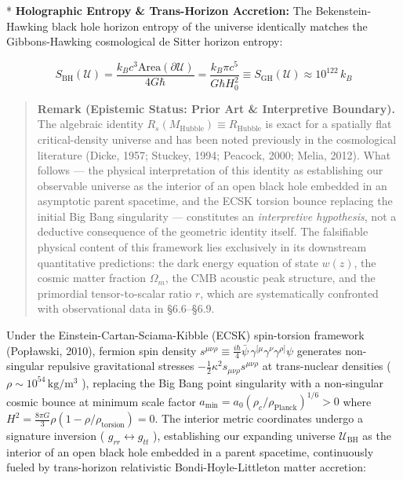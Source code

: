 \documentclass[11pt,a4paper]{article}
\theoremstyle{definition}
\theoremstyle{remark}
\begin{document}
* \textbf{Holographic Entropy \& Trans-Horizon Accretion:}
The Bekenstein-Hawking black hole horizon entropy of the universe identically matches the Gibbons-Hawking cosmological de Sitter horizon entropy:


\begin{equation}
\boxed{S_{\text{BH}}(\mathcal{U}) = \frac{k_B c^3 \mathrm{Area}(\partial \mathcal{U})}{4 G \hbar} = \frac{k_B \pi c^5}{G \hbar H_0^2} \equiv S_{\text{GH}}(\mathcal{U}) \approx 10^{122} \, k_B}
\end{equation}


\begin{quote}\textbf{Remark (Epistemic Status: Prior Art \& Interpretive Boundary).} The algebraic identity $R_s(M_{\text{Hubble}}) \equiv R_{\text{Hubble}}$ is exact for a spatially flat critical-density universe and has been noted previously in the cosmological literature (Dicke, 1957; Stuckey, 1994; Peacock, 2000; Melia, 2012). What follows — the physical interpretation of this identity as establishing our observable universe as the interior of an open black hole embedded in an asymptotic parent spacetime, and the ECSK torsion bounce replacing the initial Big Bang singularity — constitutes an \textit{interpretive hypothesis}, not a deductive consequence of the geometric identity itself. The falsifiable physical content of this framework lies exclusively in its downstream quantitative predictions: the dark energy equation of state $w(z)$, the cosmic matter fraction $\Omega_m$, the CMB acoustic peak structure, and the primordial tensor-to-scalar ratio $r$, which are systematically confronted with observational data in \S 6.6–\S 6.9.\end{quote}

Under the Einstein-Cartan-Sciama-Kibble (ECSK) spin-torsion framework (Popławski, 2010), fermion spin density $s^{\mu\nu\rho} \equiv \frac{i\hbar}{4}\bar{\psi} \, \gamma^{[\mu}\gamma^\nu\gamma^{\rho]}\psi$ generates non-singular repulsive gravitational stresses $-\frac{1}{2}\kappa^2 s_{\mu\nu\rho}s^{\mu\nu\rho}$ at trans-nuclear densities ( $\rho \sim 10^{54} \, \mathrm{kg/m^3}$ ), replacing the Big Bang point singularity with a non-singular cosmic bounce at minimum scale factor $a_{\text{min}} = a_0 (\rho_c / \rho_{\text{Planck}})^{1/6} > 0$ where $H^2 = \frac{8\pi G}{3}\rho(1 - \rho/\rho_{\text{torsion}}) = 0$. The interior metric coordinates undergo a signature inversion ( $g_{rr} \leftrightarrow g_{tt}$ ), establishing our expanding universe $\mathcal{U}_{\text{BH}}$ as the interior of an open black hole embedded in a parent spacetime, continuously fueled by trans-horizon relativistic Bondi-Hoyle-Littleton matter accretion:
\end{document}
